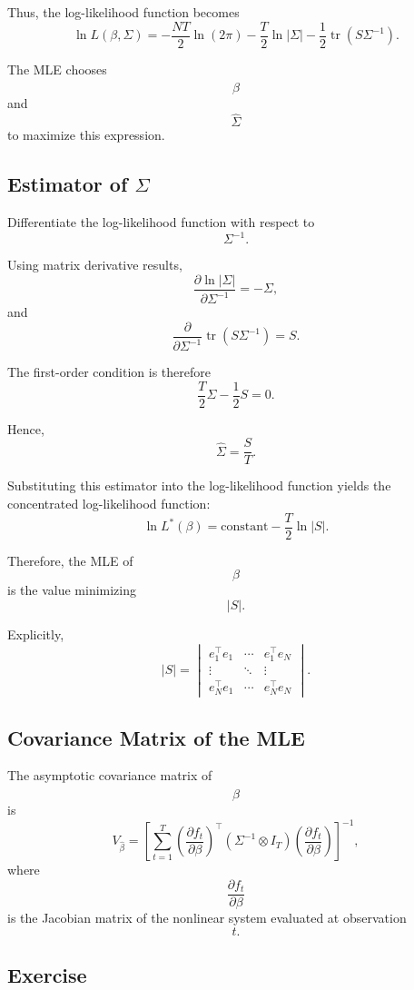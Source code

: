 Thus,
the log-likelihood function becomes
\[
\ln L(\beta,\Sigma)
=
-\frac{NT}{2}\ln(2\pi)
-
\frac{T}{2}\ln|\Sigma|
-
\frac12
\operatorname{tr}(S\Sigma^{-1}).
\]

The MLE chooses
\[
\hat\beta
\]
and
\[
\hat\Sigma
\]
to maximize this expression.

\subsection{Estimator of \(\Sigma\)}

Differentiate the log-likelihood function with respect to
\[
\Sigma^{-1}.
\]

Using matrix derivative results,
\[
\frac{\partial \ln|\Sigma|}{\partial \Sigma^{-1}}
=
-\Sigma,
\]
and
\[
\frac{\partial}{\partial \Sigma^{-1}}
\operatorname{tr}(S\Sigma^{-1})
=
S.
\]

The first-order condition is therefore
\[
\frac{T}{2}\Sigma
-
\frac12 S
=
0.
\]

Hence,
\[
\hat\Sigma
=
\frac{S}{T}.
\]

Substituting this estimator into the log-likelihood function yields the concentrated log-likelihood function:
\[
\ln L^*(\beta)
=
\text{constant}
-
\frac{T}{2}\ln|S|.
\]

Therefore,
the MLE of
\[
\beta
\]
is the value minimizing
\[
|S|.
\]

Explicitly,
\[
|S|
=
\begin{vmatrix}
e_1^\top e_1 & \cdots & e_1^\top e_N\\
\vdots & \ddots & \vdots\\
e_N^\top e_1 & \cdots & e_N^\top e_N
\end{vmatrix}.
\]

\subsection{Covariance Matrix of the MLE}

The asymptotic covariance matrix of
\[
\hat\beta
\]
is
\[
V_{\hat\beta}
=
\left[
\sum_{t=1}^T
\left(
\frac{\partial f_t}{\partial\beta}
\right)^\top
(\Sigma^{-1}\otimes I_T)
\left(
\frac{\partial f_t}{\partial\beta}
\right)
\right]^{-1},
\]
where
\[
\frac{\partial f_t}{\partial\beta}
\]
is the Jacobian matrix of the nonlinear system evaluated at observation
\[
t.
\]

\subsection{Exercise}

